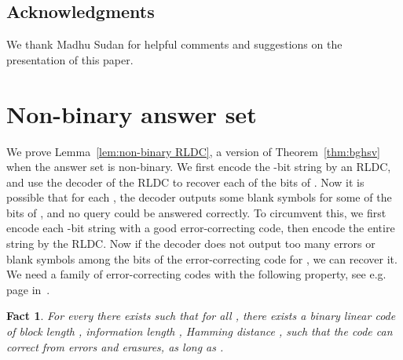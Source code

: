 \documentclass[11pt,english]{article}
\newtheorem{fact}[theorem]{Fact}
\theoremstyle{definition}
\theoremstyle{remark}
\begin{document}
\subsection*{Acknowledgments}
We thank Madhu Sudan for helpful comments and suggestions on the presentation of this paper.




\appendix
\section{Non-binary answer set\label{sec:Non-binary-alphabets}}
We prove Lemma~\ref{lem:non-binary RLDC}, a version of Theorem~\ref{thm:bghsv}
when the answer set  is non-binary. We first encode the -bit
string  by an RLDC, and
use the decoder of the RLDC to recover each of the  bits of
. Now it is possible that for each , the decoder
outputs some blank symbols  for some of the bits of ,
and no query could be answered correctly. To circumvent this, we first
encode each -bit string  with a good error-correcting
code, then encode the entire string by the RLDC. Now if the decoder
does not output too many errors or blank symbols among the bits of
the error-correcting code for , we can recover it. We need
a family of error-correcting codes with the following property, see
e.g. page  in~\cite{huffman-coding}.

\begin{fact}\label{fact:good code} For every 
there exists  such that for all , there exists a binary
linear code of block length , information length , Hamming
distance , such that the code can correct from  errors
and  erasures, as long as . \end{fact}
\end{document}
